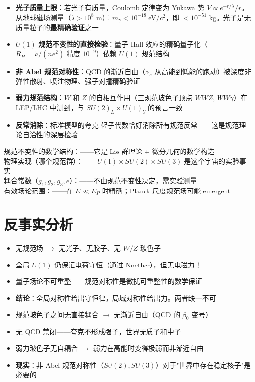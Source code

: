 \begin{oombox}
  \begin{itemize}
    \item \textbf{光子质量上限}：若光子有质量，Coulomb 定律变为 Yukawa 势 $V \propto e^{-r/\lambda}/r$。从地球磁场测量（$\lambda > 10^8$ m）：$m_\gamma < 10^{-18}$ eV/$c^2$，即 $< 10^{-51}$ kg。光子是无质量粒子的\textbf{最精确验证}之一
    \item \textbf{$U(1)$ 规范不变性的直接检验}：量子 Hall 效应的精确量子化（$R_H = h/(n e^2)$ 精度 $10^{-9}$）依赖 $U(1)$ 规范结构
    \item \textbf{非 Abel 规范对称性}：QCD 的渐近自由（$\alpha_s$ 从高能到低能的跑动）被深度非弹性散射、喷注物理、强子对撞精确验证
    \item \textbf{弱力规范结构}：$W$ 和 $Z$ 的自相互作用（三规范玻色子顶点 $WWZ$, $WW\gamma$）在 LEP/LHC 中测到，与 $SU(2)_L\times U(1)_Y$ 的预言一致
    \item \textbf{反常消除}：标准模型的夸克-轻子代数恰好消除所有规范反常——这是规范理论自洽性的深层检验
  \end{itemize}
\end{oombox}

\precisionbox[R3 精度等级]
  规范不变性的数学结构：\precexact ——它是 Lie 群理论 + 微分几何的数学构造\\
  物理实现（哪个规范群）：\preccontingent ——$U(1)\times SU(2)\times SU(3)$ 是这个宇宙的实验事实\\
  耦合常数（$g_1, g_2, g_3, e$）：\preccontingent ——不由规范不变性决定，需实验测量\\
  有效场论范围：\preceffective ——在 $E \ll E_P$ 时精确；Planck 尺度规范场可能 emergent
\endprecisionbox

\section*{反事实分析}

\begin{limitbox}
  \begin{itemize}
    \item 无规范场 $\to$ 无光子、无胶子、无 $W/Z$ 玻色子
    \item 全局 $U(1)$ 仍保证电荷守恒（通过 Noether），但无电磁力！
    \item 量子场论不可重整——规范对称性是微扰可重整性的数学保证
    \item \textbf{结论}：全局对称性给出守恒律，局域对称性给出力。两者缺一不可
  \end{itemize}
\end{limitbox}

\begin{limitbox}
  \begin{itemize}
    \item 规范玻色子之间无直接耦合 $\to$ 无渐近自由（QCD 的 $\beta_0$ 变号）
    \item 无 QCD 禁闭——夸克不形成强子，世界无质子和中子
    \item 弱力玻色子无自耦合 $\to$ 弱力在高能时变得极弱而非渐近自由
    \item \textbf{现实}：非 Abel 规范对称性（$SU(2), SU(3)$）对于"世界中存在稳定核子"是必要的
  \end{itemize}
\end{limitbox}

